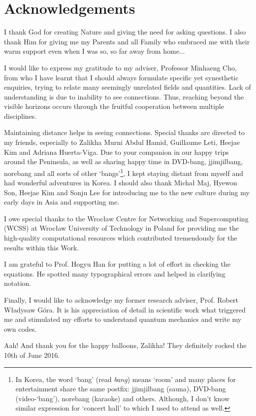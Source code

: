 \documentclass[b5paper,oneside,fleqn,11pt]{book}
\newcommand\specialsection{%
  \titleformat{\chapter}[display]
{\large\bfseries}{\chaptertitlename\ \thechapter}{20pt}{\Huge}
}
\begin{document}
{\specialsection
\chapter{Acknowledgements}
I thank God for creating Nature and giving the need for asking questions.
I also thank Him for giving me my Parents and all Family who embraced me
with their warm support even when I was so, so far away from home$\ldots$

I would like to express my gratitude to my adviser, Professor Minhaeng Cho,
from who I have learnt
that I should always formulate specific yet synesthetic enquiries,
trying to relate many seemingly unrelated fields and quantities.
Lack of understanding is due to inability to see connections.
Thus, reaching beyond the visible horizons occurs through the fruitful cooperation
between multiple disciplines.

Maintaining distance helps in seeing connections.
Special thanks are directed to my friends, especially to Zalikha Murni Abdul Hamid,
Guillaume Leti, Heejae Kim and Adriana Huerta\hyp{}Viga. Due to your companion
in our happy trips around the Peninsula, as well as
sharing happy time in DVD\hyp{bang}, jjimjilbang, norebang and all sorts of other `bangs'\footnote{In Korea,
the word `bang' (read \emph{bang}) means `room' and many places
for entertainment share the same postfix: jjimjilbang (sauna), DVD\hyp{}bang (video-`bang'),
norebang (karaoke) and others.
Although, I don't know similar expression for `concert hall' to which I used to attend
as well.},
I kept staying distant
from myself and had wonderful adventures in Korea. 
I should also 
thank Micha{\l} Maj, Hyewon Son, Heejae Kim and Sonju Lee for introducing me to the new culture
during my early days in Asia and supporting me.

I owe special thanks to the Wroc{\l}aw Centre for Networking and Supercomputing
(WCSS) at Wroc{\l}aw University of Technology in Poland for providing me 
the high\hyp{}quality computational resources which contributed tremendously
for the results within this Work.

I am grateful to Prof. Hogyu Han for putting a lot of effort in checking
the equations. He spotted many typographical errors and helped
in clarifying notation.

Finally, I would like to acknowledge my former research adviser, Prof. Robert W{\l}a\-dys\-{\l}aw G{\'o}ra.
It is his appreciation of detail in scientific work what triggered me and stimulated
my efforts to understand quantum mechanics and write my own codes.

Aah! And thank you for the happy balloons, Zalikha! They definitely rocked the 10th of June 2016.


}
\end{document}
